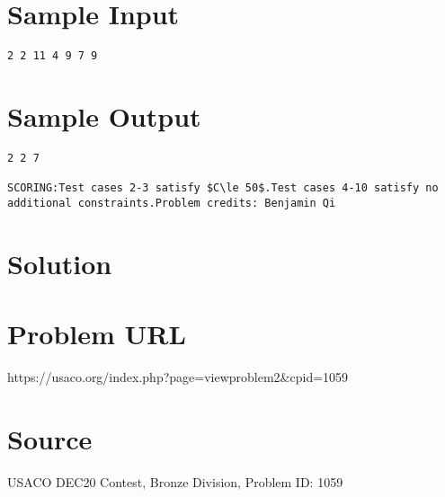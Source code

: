 \documentclass[12pt]{article}
\begin{document}
\section*{Sample Input}
\begin{verbatim}
2 2 11 4 9 7 9
\end{verbatim}

\section*{Sample Output}
\begin{verbatim}
2 2 7

SCORING:Test cases 2-3 satisfy $C\le 50$.Test cases 4-10 satisfy no additional constraints.Problem credits: Benjamin Qi
\end{verbatim}

\section*{Solution}


\section*{Problem URL}
https://usaco.org/index.php?page=viewproblem2&cpid=1059

\section*{Source}
USACO DEC20 Contest, Bronze Division, Problem ID: 1059
\end{document}
